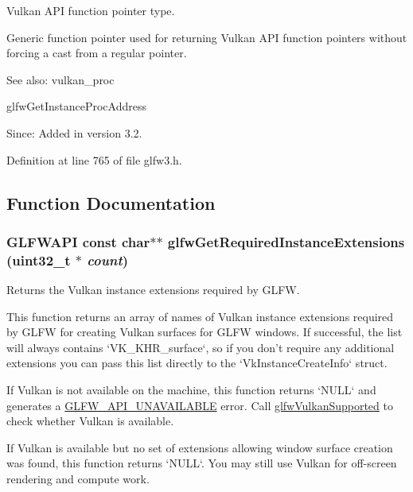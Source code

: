 Vulkan API function pointer type. 

Generic function pointer used for returning Vulkan API function pointers without forcing a cast from a regular pointer.

\begin{Desc}
\item[See also:]vulkan\_\-proc 

glfwGetInstanceProcAddress\end{Desc}
\begin{Desc}
\item[Since:]Added in version 3.2. \end{Desc}


Definition at line 765 of file glfw3.h.

\subsection{Function Documentation}
\hypertarget{group__vulkan_g70adaf0cfc99adc484c49ea99e17c2cf}{
\subsubsection[glfwGetRequiredInstanceExtensions]{\setlength{\rightskip}{0pt plus 5cm}GLFWAPI const char$\ast$$\ast$ glfwGetRequiredInstanceExtensions (uint32\_\-t $\ast$ {\em count})}}
\label{group__vulkan_g70adaf0cfc99adc484c49ea99e17c2cf}


Returns the Vulkan instance extensions required by GLFW. 

This function returns an array of names of Vulkan instance extensions required by GLFW for creating Vulkan surfaces for GLFW windows. If successful, the list will always contains `VK\_\-KHR\_\-surface`, so if you don't require any additional extensions you can pass this list directly to the `VkInstanceCreateInfo` struct.

If Vulkan is not available on the machine, this function returns `NULL` and generates a \hyperlink{group__errors_g56882b290db23261cc6c053c40c2d08e}{GLFW\_\-API\_\-UNAVAILABLE} error. Call \hyperlink{group__vulkan_g72e7c3757d9ff2333181a5569bb7c403}{glfwVulkanSupported} to check whether Vulkan is available.

If Vulkan is available but no set of extensions allowing window surface creation was found, this function returns `NULL`. You may still use Vulkan for off-screen rendering and compute work.

